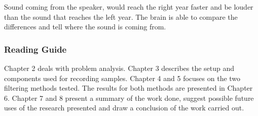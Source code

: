 Sound coming from the speaker, would reach  the right year faster and be louder than 
the sound that reaches the left year. The brain is able to compare the differences
and tell where the sound is coming from.


\subsubsection{Reading Guide}
Chapter 2 deals with problem analysis. Chapter 3 describes the setup and components
used for recording samples. Chapter 4 and 5 focuses on the two filtering methods
tested. The results for both methods are presented in Chapter 6. Chapter 7 and 
8 present a summary of the work done, suggest possible future uses of the research 
presented and draw a conclusion of the work carried out.
